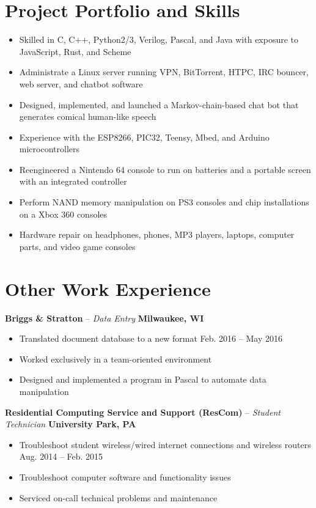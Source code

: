 \documentclass[letterpaper,10pt]{article}
\begin{document}
\section{Project Portfolio and Skills}
\begin{itemize}
\item Skilled in C, C++, Python2/3, Verilog, Pascal, and Java with exposure to JavaScript, Rust, and Scheme
\item Administrate a Linux server running VPN, BitTorrent, HTPC, IRC bouncer, web server, and chatbot software
\item Designed, implemented, and launched a Markov-chain-based chat bot that generates comical human-like speech
\item Experience with the ESP8266, PIC32, Teensy, Mbed, and Arduino microcontrollers
\item Reengineered a Nintendo 64 console to run on batteries and a portable screen with an integrated controller
\item Perform NAND memory manipulation on PS3 consoles and chip installations on a Xbox 360 consoles
\item Hardware repair on headphones, phones, MP3 players, laptops, computer parts, and video game consoles
\end{itemize}

\section{Other Work Experience}
\textbf{Briggs \& Stratton} -- \textit{Data Entry} \hfill \textbf{Milwaukee, WI}
{\setlength{\parskip}{0pt}\begin{itemize}
\item Translated document database to a new format \hfill Feb. 2016 -- May 2016
\item Worked exclusively in a team-oriented environment
\item Designed and implemented a program in Pascal to automate data manipulation
\end{itemize}}
\textbf{Residential Computing Service and Support (ResCom)} -- \textit{Student Technician} \hfill \textbf{University Park, PA}
{\setlength{\parskip}{0pt}\begin{itemize}
\item Troubleshoot student wireless/wired internet connections and wireless routers \hfill Aug. 2014 -- Feb. 2015
\item Troubleshoot computer software and functionality issues
\item Serviced on-call technical problems and maintenance
\end{itemize}}
\end{document}
